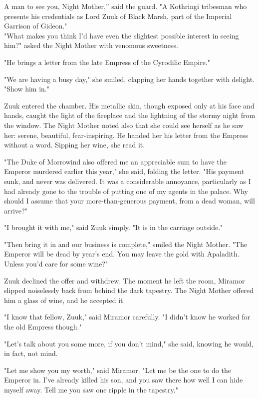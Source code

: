 \clearpage
{}

\dropcap A man to see you, Night Mother,'' said the guard. "A Kothringi tribesman who presents his credentials as Lord Zuuk of Black Marsh, part of the Imperial Garrison of Gideon."\\"What makes you think I'd have even the slightest possible interest in seeing him?" asked the Night Mother with venomous sweetness.

"He brings a letter from the late Empress of the Cyrodilic Empire."

"We are having a busy day," she smiled, clapping her hands together with delight. "Show him in."

Zuuk entered the chamber. His metallic skin, though exposed only at his face and hands, caught the light of the fireplace and the lightning of the stormy night from the window. The Night Mother noted also that she could see herself as he saw her: serene, beautiful, fear-inspiring. He handed her his letter from the Empress without a word. Sipping her wine, she read it.

"The Duke of Morrowind also offered me an appreciable sum to have the Emperor murdered earlier this year," she said, folding the letter. "His payment sunk, and never was delivered. It was a considerable annoyance, particularly as I had already gone to the trouble of putting one of my agents in the palace. Why should I assume that your more-than-generous payment, from a dead woman, will arrive?"

"I brought it with me," said Zuuk simply. "It is in the carriage outside."

"Then bring it in and our business is complete," smiled the Night Mother. "The Emperor will be dead by year's end. You may leave the gold with Apaladith. Unless you'd care for some wine?"

Zuuk declined the offer and withdrew. The moment he left the room, Miramor slipped noiselessly back from behind the dark tapestry. The Night Mother offered him a glass of wine, and he accepted it.

"I know that fellow, Zuuk," said Miramor carefully. "I didn't know he worked for the old Empress though."

"Let's talk about you some more, if you don't mind," she said, knowing he would, in fact, not mind.

"Let me show you my worth," said Miramor. "Let me be the one to do the Emperor in. I've already killed his son, and you saw there how well I can hide myself away. Tell me you saw one ripple in the tapestry."

